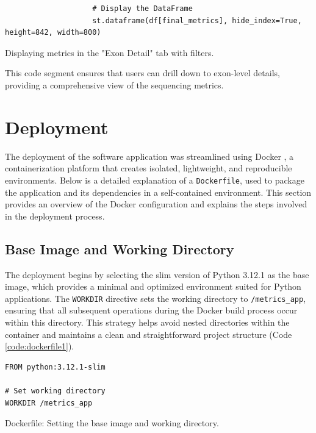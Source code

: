 \begin{longlisting}
\begin{verbatim}
                    # Display the DataFrame
                    st.dataframe(df[final_metrics], hide_index=True, height=842, width=800)
\end{verbatim}
\caption{Displaying metrics in the "Exon Detail" tab with filters.}
\label{code:results-exon-detail-tab}
\end{longlisting}

This code segment ensures that users can drill down to exon-level details, providing a comprehensive view of the sequencing metrics.

\section{Deployment}

The deployment of the software application was streamlined using Docker \cite{merkel2014docker}, a containerization platform that creates isolated, lightweight, and reproducible environments. Below is a detailed explanation of a \texttt{Dockerfile}, used to package the application and its dependencies in a self-contained environment. This section provides an overview of the Docker configuration and explains the steps involved in the deployment process.

\subsection{Base Image and Working Directory}

The deployment begins by selecting the slim version of Python 3.12.1 as the base image, which provides a minimal and optimized environment suited for Python applications. The \texttt{WORKDIR} directive sets the working directory to \texttt{/metrics\_app}, ensuring that all subsequent operations during the Docker build process occur within this directory. This strategy helps avoid nested directories within the container and maintains a clean and straightforward project structure (Code \ref{code:dockerfile1}).

\begin{longlisting}
\begin{verbatim}
FROM python:3.12.1-slim

# Set working directory
WORKDIR /metrics_app
\end{verbatim}
\caption{Dockerfile: Setting the base image and working directory.}
\label{code:dockerfile1}
\end{longlisting}

